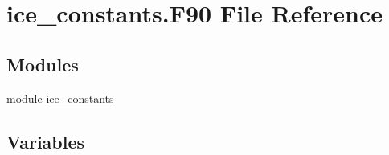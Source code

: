 \hypertarget{ice__constants_8F90}{
\section{ice\_\-constants.F90 File Reference}
\label{ice__constants_8F90}
}
\subsection*{Modules}
\begin{DoxyCompactItemize}
\item 
module \hyperlink{namespaceice__constants}{ice\_\-constants}
\end{DoxyCompactItemize}
\subsection*{Variables}
